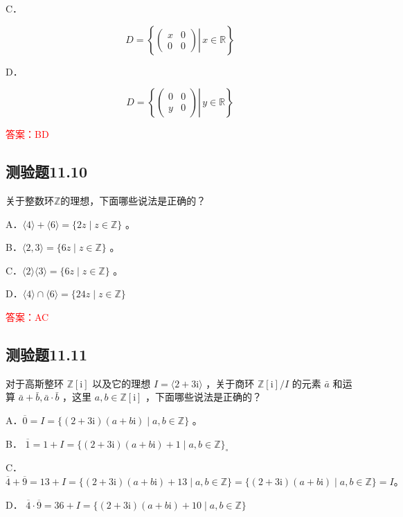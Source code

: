 \documentclass[UTF8, heading=true]{ctexart}
\begin{document}
C．

$$
D=\left\{\left.\left(\begin{array}{ll}
x & 0 \\
0 & 0
\end{array}\right) \right\rvert\, x \in \mathbb{R}\right\}
$$


D．

$$
D=\left\{\left.\left(\begin{array}{ll}
0 & 0 \\
y & 0
\end{array}\right) \right\rvert\, y \in \mathbb{R}\right\}
$$

\textcolor{red}{答案：BD}

\subsection{测验题11.10}

关于整数环$\mathbb{Z}$的理想，下面哪些说法是正确的？

A．$\langle 4\rangle+\langle 6\rangle=\{2 z \mid z \in \mathbb{Z}\}$ 。

B．$\langle 2,3\rangle=\{6 z \mid z \in \mathbb{Z}\}$ 。

C．$\langle 2\rangle\langle 3\rangle=\{6 z \mid z \in \mathbb{Z}\}$ 。

D．$\langle 4\rangle \cap\langle 6\rangle=\{24 z \mid z \in \mathbb{Z}\}$


\textcolor{red}{答案：AC}

\subsection{测验题11.11}

对于高斯整环 $\mathbb{Z}[\mathrm{i}]$ 以及它的理想 $I=\langle 2+3 \mathrm{i}\rangle$ ，关于商环 $\mathbb{Z}[\mathrm{i}] / I$ 的元素 $\bar{a}$ 和运算 $\bar{a}+\bar{b}, \bar{a} \cdot \bar{b}$ ，这里 $a, b \in \mathbb{Z}[\mathrm{i}]$ ，下面哪些说法是正确的？

A．$\overline{0}=I=\{(2+3 \mathrm{i})(a+b \mathrm{i}) \mid a, b \in \mathbb{Z}\}$ 。

B．
$
\overline{1}=1+I=\{(2+3 \mathrm{i})(a+b \mathrm{i})+1 \mid a, b \in \mathbb{Z}\}_{\circ}
$


C．
$
\overline{4}+\overline{9}=13+I=\{(2+3 \mathrm{i})(a+b \mathrm{i})+13 \mid a, b \in \mathbb{Z}\}=\{(2+3 \mathrm{i})(a+b \mathrm{i}) \mid a, b \in \mathbb{Z}\}=I 。
$


D．
$
\overline{4} \cdot \overline{9}=36+I=\{(2+3 \mathrm{i})(a+b \mathrm{i})+10 \mid a, b \in \mathbb{Z}\}
$
\end{document}
